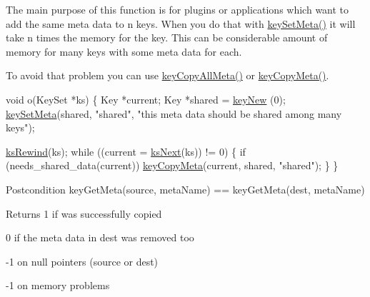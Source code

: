 The main purpose of this function is for plugins or applications which want to add the same meta data to n keys. When you do that with \hyperlink{group__keymeta_gae1f15546b234ffb6007d8a31178652b9}{key\-Set\-Meta()} it will take n times the memory for the key. This can be considerable amount of memory for many keys with some meta data for each.

To avoid that problem you can use \hyperlink{group__keymeta_ga8e63720a65610a29597494d0671f9401}{key\-Copy\-All\-Meta()} or \hyperlink{group__keymeta_ga9a22b992478e613c8788bd460b4a1f0c}{key\-Copy\-Meta()}.


\begin{DoxyCode}
\textcolor{keywordtype}{void} o(KeySet *ks)
\{
        Key *current;
        Key *shared = \hyperlink{group__key_gaf6893c038b3ebee90c73a9ea8356bebf}{keyNew} (0);
        \hyperlink{group__keymeta_gae1f15546b234ffb6007d8a31178652b9}{keySetMeta}(shared, \textcolor{stringliteral}{"shared"}, \textcolor{stringliteral}{"this meta data should be shared
       among many keys"});

        \hyperlink{group__keyset_gabe793ff51f1728e3429c84a8a9086b70}{ksRewind}(ks);
        \textcolor{keywordflow}{while} ((current = \hyperlink{group__keyset_ga317321c9065b5a4b3e33fe1c399bcec9}{ksNext}(ks)) != 0)
        \{
                \textcolor{keywordflow}{if} (needs\_shared\_data(current)) \hyperlink{group__keymeta_ga9a22b992478e613c8788bd460b4a1f0c}{keyCopyMeta}(current,
       shared, \textcolor{stringliteral}{"shared"});
        \}
\}
\end{DoxyCode}


\begin{DoxyPostcond}{Postcondition}
key\-Get\-Meta(source, meta\-Name) == key\-Get\-Meta(dest, meta\-Name)
\end{DoxyPostcond}
\begin{DoxyReturn}{Returns}
1 if was successfully copied 

0 if the meta data in dest was removed too 

-\/1 on null pointers (source or dest) 

-\/1 on memory problems 
\end{DoxyReturn}

